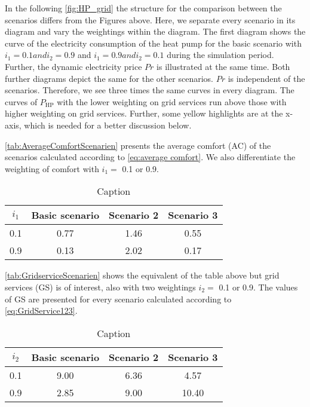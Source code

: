 In the following \autoref{fig:HP_grid} the structure for the comparison between the scenarios differs from the Figures above. Here, we separate every scenario in its diagram and vary the weightings within the diagram. The first diagram shows the curve of the electricity consumption of the heat pump for the basic scenario with $i_\text{1} = 0.1 and i_\text{2} = 0.9$ and $i_\text{1} = 0.9 and i_\text{2} = 0.1$ during the simulation period. Further, the dynamic electricity price $Pr$ is illustrated at the same time. Both further diagrams depict the same for the other scenarios. $Pr$ is independent of the scenarios. Therefore, we see three times the same curves in every diagram. The curves of $P_\text{HP}$ with the lower weighting on grid services run above those with higher weighting on grid services. Further, some yellow highlights are at the x-axis, which is needed for a better discussion below. 
    \begin{figure}[H]
           \centering
        \def\svgwidth{0.9\textwidth}
        
        \caption{}
         \label{fig:HP_grid}
    \end{figure}
\autoref{tab:AverageComfortScenarien} presents the average comfort (AC) of the scenarios calculated according to \autoref{eq:average comfort}. We also differentiate the weighting of comfort with $i_\text{1} =$ 0.1 or 0.9. 
    \begin{table}[H]
        \centering
        \begin{tabular}{c||c|c|c}
          $i_\text{1}$  &  Basic scenario & Scenario 2 & Scenario 3\\
          \hline  \hline
             0.1 & 0.77 & 1.46 & 0.55\\
             0.9 & 0.13 & 2.02 & 0.17\\
        \end{tabular}
        \caption{Caption}
        \label{tab:AverageComfortScenarien}
    \end{table}
\autoref{tab:GridserviceScenarien} shows the equivalent of the table above but grid services (GS) is of interest, also with two weightings  $i_\text{2} =$ 0.1 or 0.9. The values of GS are presented for every scenario calculated according to \autoref{eq:GridService123}.
    \begin{table}[H]
        \centering
        \begin{tabular}{c||c|c|c}
          $i_\text{2}$  &  Basic scenario & Scenario 2 & Scenario 3\\
          \hline  \hline
             0.1 & 9.00 & 6.36 & 4.57\\
             0.9 & 2.85 & 9.00 & 10.40\\
        \end{tabular}
        \caption{Caption}
        \label{tab:GridserviceScenarien}
    \end{table}
